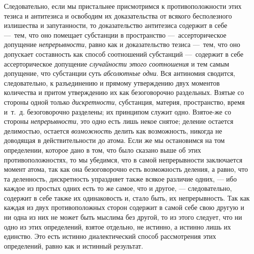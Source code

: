 Следовательно, если мы пристальнее присмотримся к противоположности этих
тезиса и антитезиса и освободим их доказательства от всякого бесполезного
излишества и запутанности, то доказательство антитезиса содержит в себе
—~тем, что оно помещает субстанции в пространство —~ассерторическое
допущение {\em непрерывности}, равно как и
доказательство тезиса —~тем, что оно допускает составность как способ
соотношений субстанций —~содержит в себе ассерторическое допущение
{\em случайности этого соотношения} и тем самым
допущение, что субстанции суть {\em абсолютные одни}.
Вся антиномия сводится, следовательно, к разъединению и прямому утверждению
двух моментов количества и притом утверждению их как безоговорочно
раздельных. Взятые со стороны одной только
{\em дискретности}, субстанция, материя, пространство,
время и~т.~д. безоговорочно разделены; их принципом служит одно. Взятое-же
со стороны {\em непрерывности}, это одно есть лишь
некое снятое; деление остается делимостью, остается
{\em возможность} делить как возможность, никогда не
доводящая в действительности до атома. Если же мы остановимся на том
определении, которое дано в том, что было сказано выше об этих
противоположностях, то мы убедимся, что в самой непрерывности заключается
момент атома, так как она безоговорочно есть возможность деления, а равно,
что та деленность, дискретность упраздняет также всякое различие одних, —
ибо каждое из простых одних есть то же самое, что и другое, —
следовательно, содержит в себе также их одинаковость и, стало быть, их
непрерывность. Так как каждая из двух противоположных сторон содержит в
самой себе свою другую и ни одна из них не может быть мыслима без другой,
то из этого следует, что ни одно из этих определений, взятое отдельно, не
истинно, а истинно лишь их единство. Это есть истинно диалектический способ
рассмотрения этих определений, равно как и истинный результат.

